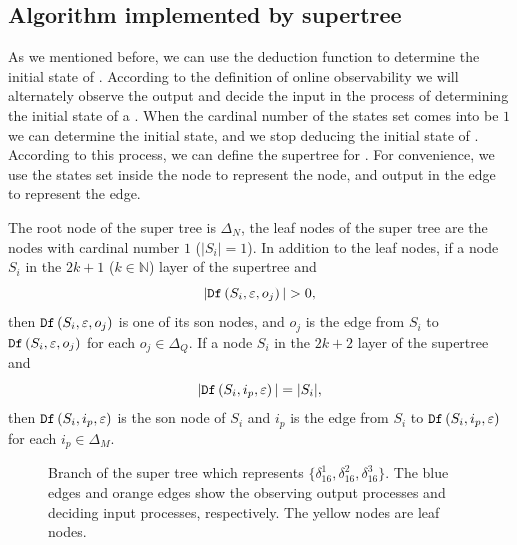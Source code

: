 \subsection{Algorithm implemented by supertree} As we mentioned before, we can use the deduction function to determine the initial state of \BCNs. According to the definition of online observability we will alternately observe the output and decide the input in the process of determining the initial state of a \BCN. When the  cardinal number of the states set comes into be $1$ we can determine the initial state, and we stop deducing the initial state of \BCNs. According to this process, we can define the supertree for \BCNs. For convenience, we use the states set inside the node to represent the node, and output in the edge to represent the edge.
\begin{definition}
The root node of the super tree is $\Delta_N$, the leaf nodes of the super tree are the nodes with cardinal number $1$ ($|S_i|=1$). In addition to the leaf nodes, if a node $S_i$ in the $2k + 1$ ($k\in \mathbb{N}$) layer of the supertree and 
\[|\Ded\left(S_i,\varepsilon, o_j\right)|>0,\]
 then ${\tt Df}\left(S_i,\varepsilon, o_j\right)$ is one of its son nodes, and $o_j$ is the edge from $S_i$ to ${\tt Df}\left(S_i,\varepsilon, o_j\right)$ for each $o_j \in \Delta_Q$. If a node $S_i$ in the $2k+2$ layer of the supertree and  
\[|{\tt Df}\left(S_i,i_p,\varepsilon\right)|=|S_i|,\] 
then ${\tt Df}\left(S_i,i_p,\varepsilon\right)$ is the son node of $S_i$ and $i_p$ is the edge from $S_i$ to ${\tt Df}\left(S_i,i_p,\varepsilon\right)$ for each $i_p \in \Delta_M$. 
\end{definition}

  \begin{figure}[thpb]
      \centering
      
      \caption{Branch of the super tree which represents $\{\delta_{16}^1,\delta_{16}^2,\delta_{16}^3\}$. The blue edges and orange edges show the observing output processes and deciding input processes, respectively. The yellow nodes are leaf nodes.}
      \label{fig:3}
   \end{figure}

